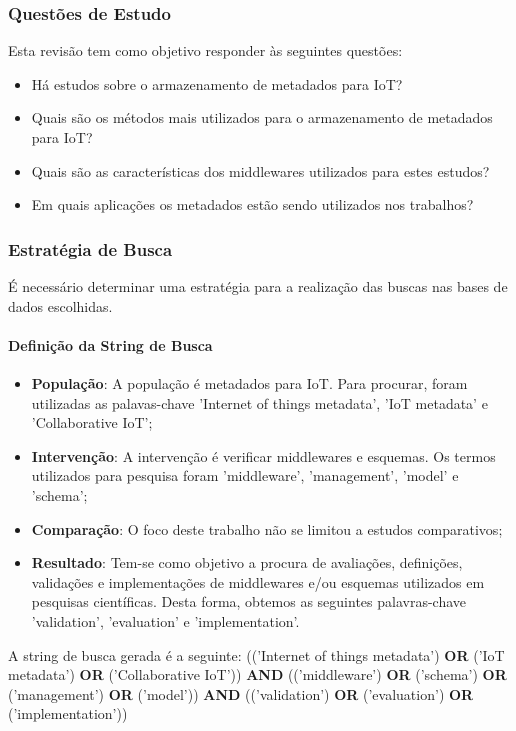 \subsubsection{Questões de Estudo}
\quad Esta revisão tem como objetivo responder às seguintes questões:
\begin{itemize}
  \item Há estudos sobre o armazenamento de metadados para \acrlong{IoT}?
  \item Quais são os métodos mais utilizados para o armazenamento de metadados para \acrshort{IoT}?
  \item Quais são as características dos middlewares utilizados para estes estudos?
  \item Em quais aplicações os metadados estão sendo utilizados nos trabalhos?
\end{itemize}

\subsubsection{Estratégia de Busca}
\quad É necessário determinar uma estratégia para a realização das buscas nas bases de dados escolhidas.

\paragraph{Definição da String de Busca}
\begin{itemize}
  \item \textbf{População}: A população é metadados para \acrshort{IoT}. Para procurar, foram utilizadas as palavas-chave 'Internet of things metadata', 'IoT metadata' e 'Collaborative IoT';
  \item \textbf{Intervenção}: A intervenção é verificar middlewares e esquemas. Os termos utilizados para pesquisa foram 'middleware', 'management', 'model' e 'schema';
  \item \textbf{Comparação}: O foco deste trabalho não se limitou a estudos comparativos;
  \item \textbf{Resultado}: Tem-se como objetivo a procura de avaliações, definições, validações e implementações de middlewares e/ou esquemas utilizados em pesquisas científicas. Desta forma, obtemos as seguintes palavras-chave
  'validation', 'evaluation' e 'implementation'.
\end{itemize}

\quad A string de busca gerada é a seguinte:
(('Internet of things metadata') \textbf{OR} ('IoT metadata') \textbf{OR} ('Collaborative IoT')) \textbf{AND} (('middleware') \textbf{OR} ('schema') \textbf{OR} ('management') \textbf{OR} ('model')) \textbf{AND} (('validation') \textbf{OR} ('evaluation') \textbf{OR} ('implementation'))

